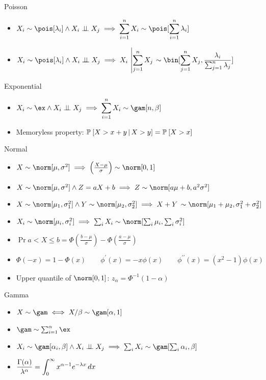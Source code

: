 \documentclass[landscape]{article}
\begin{document}
\begin{multicols*}{2}
Poisson
\begin{itemize}
  \item $X_i\dist\pois[\lambda_i] \wedge X_i \ind X_j 
    \imp \displaystyle\sumin X_i \dist \pois[\displaystyle\sumin \lambda_i]$
  \item $X_i\dist\pois[\lambda_i] \wedge X_i \ind X_j
    \imp X_i\,\left|\displaystyle\sumjn X_j\right. \dist 
   \bin[\displaystyle\sumjn X_j,\displaystyle\frac{\lambda_i}{\sumjn\lambda_j}]$
\end{itemize}

Exponential
\begin{itemize}
  \item $X_i\dist\ex \wedge  X_i \ind X_j
    \imp \displaystyle\sumin X_i\dist \gam[n,\beta]$
  \item Memoryless property: $\mathbb{P}_{}\left[X>x+y\,|\, X>y\right]=\mathbb{P}_{}\left[X>x\right]$
\end{itemize}


Normal
\begin{itemize}
  \item $X\dist \norm[\mu,\sigma^2]
    \imp \left(\frac{X-\mu}{\sigma}\right)\dist\norm[0,1] $
  \item $X\dist \norm[\mu,\sigma^2] \wedge Z = aX+b
    \imp Z\dist\norm[a\mu+b,a^2\sigma^2] $
  \item $X\dist \norm[\mu_1,\sigma_1^2] \wedge Y\dist\norm[\mu_2,\sigma_2^2]
    \imp X+Y\,\dist \norm[\mu_1+\mu_2,\sigma_1^2 + \sigma_2^2] $
  \item $X_i\dist\norm[\mu_i,\sigma_i^2]
     \imp \sum_i X_i \dist \norm[\sum_i\mu_i,\sum_i\sigma_i^2]$
   \item $\Pr{a < X \le b}= \Phi\left(\frac{b-\mu}{\sigma}\right)
     - \Phi\left(\frac{a-\mu}{\sigma}\right) $
  \item $\Phi(-x) = 1 - \Phi(x) \qquad \phi^\prime(x) = -x\phi(x) \qquad
    \phi^{\prime\prime}(x) = (x^2-1)\phi(x)$
  \item Upper quantile of $\norm[0,1]$: $z_{\alpha} = \Phi^{-1}(1-\alpha)$
\end{itemize}

Gamma
\begin{itemize}
  \item $X\dist\gam \eqv X/\beta \dist\gam[\alpha,1]$
  \item $\gam\dist \sum_{i=1}^\alpha\ex$
  \item $X_i\dist\gam[\alpha_i,\beta] \wedge X_i \ind X_j \imp
    \sum_i X_i\dist \gam[\sum_i \alpha_i,\beta]$
  \item $\displaystyle\frac{\Gamma(\alpha)}{\lambda^\alpha} 
    = \displaystyle\int_0^\infty x^{\alpha-1} e^{-\lambda x} \,dx$
\end{itemize}


\end{multicols*}
\end{document}
